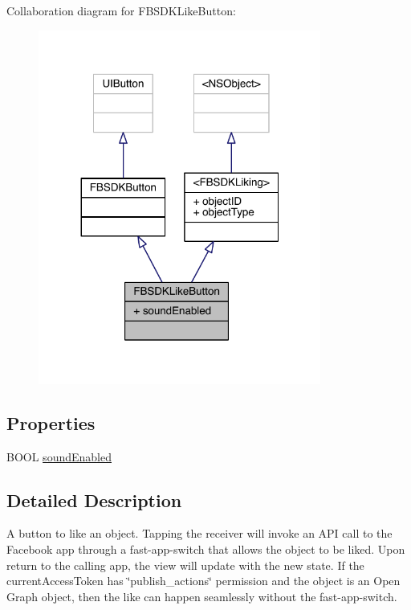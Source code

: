 Collaboration diagram for F\-B\-S\-D\-K\-Like\-Button\-:
\nopagebreak
\begin{figure}[H]
\begin{center}
\leavevmode
\includegraphics[width=263pt]{interface_f_b_s_d_k_like_button__coll__graph}
\end{center}
\end{figure}
\subsection*{Properties}
\begin{DoxyCompactItemize}
\item 
B\-O\-O\-L \hyperlink{interface_f_b_s_d_k_like_button_ab7c25ce02e165da8ebd690c2348594ee}{sound\-Enabled}
\end{DoxyCompactItemize}


\subsection{Detailed Description}
A button to like an object.  Tapping the receiver will invoke an A\-P\-I call to the Facebook app through a fast-\/app-\/switch that allows the object to be liked. Upon return to the calling app, the view will update with the new state. If the current\-Access\-Token has \char`\"{}publish\-\_\-actions\char`\"{} permission and the object is an Open Graph object, then the like can happen seamlessly without the fast-\/app-\/switch. 

